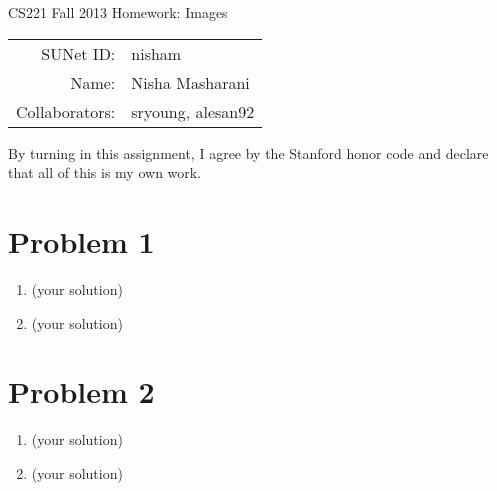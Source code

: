 \documentclass[12pt]{article}
\begin{document}
\begin{center}
{\Large CS221 Fall 2013 Homework: Images}

\begin{tabular}{rl}
SUNet ID: & nisham \\
Name: & Nisha Masharani \\
Collaborators: & sryoung, alesan92
\end{tabular}
\end{center}

By turning in this assignment, I agree by the Stanford honor code and declare
that all of this is my own work.

\section*{Problem 1}

\begin{enumerate}[label=(\alph*)]
  \item (your solution)
  \item (your solution)
\end{enumerate}

\section*{Problem 2}

\begin{enumerate}[label=(\alph*)]
  \item (your solution)
  \item (your solution)
\end{enumerate}
\end{document}
